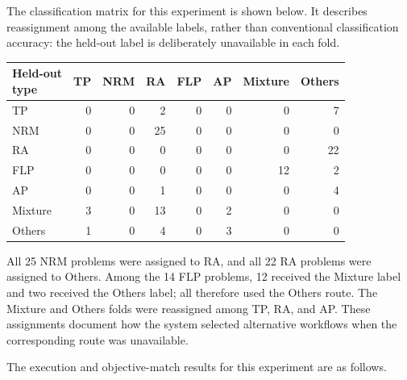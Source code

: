 \documentclass[11pt]{article}
\begin{document}
\begin{enumerate}[label=(R1.Major.\arabic*),leftmargin=*]
The classification matrix for this experiment is shown below. It describes reassignment among the available labels, rather than conventional classification accuracy: the held-out label is deliberately unavailable in each fold.

\begin{center}
\small
\setlength{\tabcolsep}{5pt}
\renewcommand{\arraystretch}{1.12}
\begin{tabular}{lrrrrrrr}
\hline
\shortstack[l]{Held-out\\type}
& TP & NRM & RA & FLP & AP & Mixture & Others \\
\hline
TP      & 0 & 0 & 2  & 0 & 0 & 0  & 7  \\
NRM     & 0 & 0 & 25 & 0 & 0 & 0  & 0  \\
RA      & 0 & 0 & 0  & 0 & 0 & 0  & 22 \\
FLP     & 0 & 0 & 0  & 0 & 0 & 12 & 2  \\
AP      & 0 & 0 & 1  & 0 & 0 & 0  & 4  \\
Mixture & 3 & 0 & 13 & 0 & 2 & 0  & 0  \\
Others  & 1 & 0 & 4  & 0 & 3 & 0  & 0  \\
\hline
\end{tabular}
\end{center}

All 25 NRM problems were assigned to RA, and all 22 RA problems were assigned to Others. Among the 14 FLP problems, 12 received the Mixture label and two received the Others label; all therefore used the Others route. The Mixture and Others folds were reassigned among TP, RA, and AP. These assignments document how the system selected alternative workflows when the corresponding route was unavailable.

The execution and objective-match results for this experiment are as follows.


\end{enumerate}
\end{document}

